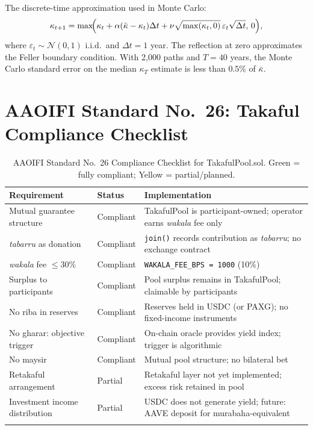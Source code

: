 \documentclass[12pt,a4paper]{article}
\newcommand{\kbar}{\bar{\kappa}}
\newcommand{\tabarru}{\textit{tabarru}}
\newcommand{\wakala}{\textit{wakala}}
\begin{document}
The discrete-time approximation used in Monte Carlo:
\begin{equation}
  \kappa_{t+1} = \max\!\Bigl(\kappa_t + \alpha(\kbar-\kappa_t)\Delta t
    + \nu\sqrt{\max(\kappa_t,0)}\,\varepsilon_t\sqrt{\Delta t},\,0\Bigr),
  \label{eq:euler_cir}
\end{equation}
where $\varepsilon_t\sim\mathcal{N}(0,1)$ i.i.d.\ and $\Delta t=1$ year.
The reflection at zero approximates the Feller boundary condition.
With 2,000 paths and $T=40$ years, the Monte Carlo standard error on the median
$\kappa_T$ estimate is less than $0.5\%$ of $\kbar$.

\section{AAOIFI Standard No.~26: Takaful Compliance Checklist}
\label{app:aaoifi}

\begin{longtable}{p{}p{}p{}}
\toprule
\textbf{Requirement} & \textbf{Status} & \textbf{Implementation} \\
\midrule
\endhead
Mutual guarantee structure & \textcolor{green!60!black}{Compliant} &
  TakafulPool is participant-owned; operator earns \wakala{} fee only \\
\tabarru{} as donation & \textcolor{green!60!black}{Compliant} &
  \texttt{join()} records contribution as \tabarru{}; no exchange contract \\
\wakala{} fee $\leq 30\%$ & \textcolor{green!60!black}{Compliant} &
  \texttt{WAKALA\_FEE\_BPS = 1000} (10\%) \\
Surplus to participants & \textcolor{green!60!black}{Compliant} &
  Pool surplus remains in TakafulPool; claimable by participants \\
No riba in reserves & \textcolor{green!60!black}{Compliant} &
  Reserves held in USDC (or PAXG); no fixed-income instruments \\
No gharar: objective trigger & \textcolor{green!60!black}{Compliant} &
  On-chain oracle provides yield index; trigger is algorithmic \\
No maysir & \textcolor{green!60!black}{Compliant} &
  Mutual pool structure; no bilateral bet \\
Retakaful arrangement & \textcolor{yellow!70!black}{Partial} &
  Retakaful layer not yet implemented; excess risk retained in pool \\
Investment income distribution & \textcolor{yellow!70!black}{Partial} &
  USDC does not generate yield; future: AAVE deposit for murabaha-equivalent \\
\bottomrule
\caption{AAOIFI Standard No.~26 Compliance Checklist for TakafulPool.sol.
  \textcolor{green!60!black}{Green} = fully compliant; \textcolor{yellow!70!black}{Yellow} = partial/planned.}
\label{tab:aaoifi_checklist}
\end{longtable}
\end{document}
